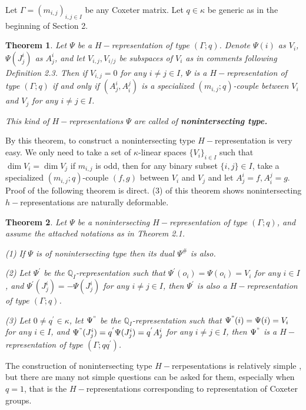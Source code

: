 \def\CTEXPreproc{Created by ctex v0.2.12, don't edit!}\documentclass[11pt]{article}
\newtheorem{thm}{Theorem}[section]
\begin{document}
 Let $\Gamma =(m_{i,j})_{i,j\in I}$ be any Coxeter matrix. Let $q\in \kappa$ be generic as in the beginning of Section 2.

 \begin{thm}
 Let $\Psi $ be a $H-$representation of type $(\Gamma;q )$. Denote $\Psi (i  ) $ as $V_i $, $ \Psi(J^i _j ) $ as $A^i _j$, and let
 $V_{i,j} , V_{i/j} $ be subspaces of $V_i $ as in comments following Definition 2.3. Then if $V_{i,j}=0$ for any $i\neq j\in I$,  $\Psi$
  is a $H-$representation of type $(\Gamma; q)$ if and only if  $( A^i _j , A^j _i  )$ is a specialized $(m_{i,j};q)$-couple between $V_i$ and $V_j$ for any $i\neq j\in I$.

    This kind of $H-$representations  $\Psi$ are called of \textbf{nonintersecting type.}

 \end{thm}

 By this theorem, to construct a nonintersecting type  $H-$representation is very easy.  We only need to take a set of $\kappa$-linear spaces $\{ V_i \} _{i\in I}$ such that $ \dim V_i =\dim V_j $ if $m_{i,j}$ is odd, then for any  binary subset $\{ i,j\} \in I$, take a specialized  $(m_{i,j};q)$-couple $(f,g)$ between $V_i $ and $V_j $ and let $A^i _j =f , A^j _i =g$. Proof of the following theorem is direct. (3) of this theorem shows nonintersecting $h-$representations are naturally deformable.

 \begin{thm} Let $\Psi$ be a nonintersecting $H-$representation of type $(\Gamma;q)$, and assume the attached notations as in Theorem 2.1.

\noindent (1) If $\Psi$ is of nonintersecting type then its dual $\Psi^{\#}$ is also.

\noindent (2) Let $\Psi ^{'} $ be the $\mathbb{Q}_{I}$-representation such that $ \Psi^{'} (o_i ) =\Psi (o_i) =V_i  $ for any $i\in I$, and
 $ \Psi^{'} (J^i _j) = - \Psi (  J^i _j )$ for any $i\neq j \in I$, then $\Psi^{'}$ is also a $H-$representation of type
 $(  \Gamma;q ) $.

\noindent (3) Let $0\neq q^{'} \in \kappa$,   let $\Psi^{"} $ be the $\mathbb{Q}_{I}$-representation such that $ \Psi^{"} (i ) =\Psi (i) =V_i  $ for any $i\in I$, and
 $ \Psi^{"} (J^i _j) = q^{'} \Psi (  J^i _j )= q^{'} A^i _j $ for any $i\neq j \in I$, then $\Psi^{"}$ is a $H-$representation of type
 $(  \Gamma;qq^{'} ) $.
  \end{thm}


The construction of nonintersecting type $H-$rerpesentations is relatively simple , but there are many not simple questions can be asked for them, especially when $q=1$, that is the $H-$representations corresponding to representation of Coxeter groups.
\end{document}
